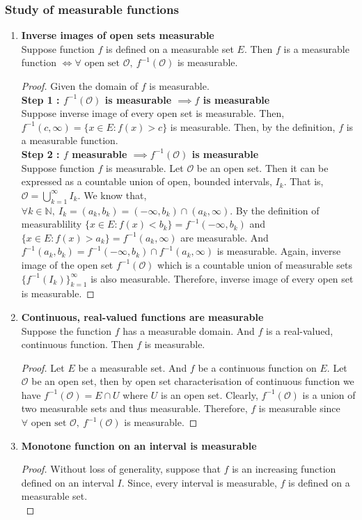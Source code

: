 \subsubsection{Study of measurable functions}
\begin{enumerate}
	\item \textbf{Inverse images of open sets measurable}\\
		Suppose function $f$ is defined on a measurable set $E$.
	Then $f$ is a measurable function $\iff \forall \text{ open set } \mathcal{O},\ f^{-1}(\mathcal{O})$ is measurable.
	\begin{proof}
	Given the domain of $f$ is measurable.\\
	\textbf{Step 1 : $f^{-1}(\mathcal{O})$ is measurable $\implies f$ is measurable}\\
	Suppose inverse image of every open set is measurable.
	Then, $f^{-1}(c,\infty) = \{ x \in E : f(x) > c \}$ is measurable.
	Then, by the definition, $f$ is a measurable function.\\

	\textbf{Step 2 : $f$ measurable $\implies f^{-1}(\mathcal{O})$ is measurable}\\
	Suppose function $f$ is measurable.
	Let $\mathcal{O}$ be an open set.
	Then it can be expressed as a countable union of open, bounded intervals, $I_k$.
	That is, $\displaystyle \mathcal{O} = \bigcup_{k=1}^\infty I_k$.
	We know that, $\forall k \in \mathbb{N},\ I_k = (a_k,b_k) = (-\infty,b_k) \cap (a_k,\infty)$.
	By the definition of measurablility $\{ x \in E : f(x) < b_k \} = f^{-1}(-\infty,b_k)$ and $\{ x\in E : f(x) > a_k \} = f^{-1}(a_k,\infty)$ are measurable.
	And $f^{-1}(a_k,b_k) = f^{-1}(-\infty,b_k) \cap f^{-1}(a_k,\infty)$  is measurable.
	Again, inverse image of the open set $f^{-1}(\mathcal{O})$ which is a countable union of measurable sets $\{f^{-1}(I_k)\}_{k=1}^\infty$ is also measurable.
	Therefore, inverse image of every open set is measurable.
	\end{proof}
\item \textbf{Continuous, real-valued functions are measurable}\\
	Suppose the function $f$ has a measurable domain. And $f$ is a real-valued, continuous function. Then $f$ is measurable.
	\begin{proof}
	Let $E$ be a measurable set.
	And $f$ be a continuous function on $E$.
	Let $\mathcal{O}$ be an open set, then by open set characterisation of continuous function we have $f^{-1}(\mathcal{O}) = E \cap U$ where $U$ is an open set.
	Clearly, $f^{-1}(\mathcal{O})$ is a union of two measurable sets and thus measurable.
	Therefore, $f$ is measurable since $\forall \text{ open set } \mathcal{O},\ f^{-1}(\mathcal{O})$ is measurable.
	\end{proof}
\item \textbf{Monotone function on an interval is measurable}
	\begin{proof}
		Without loss of generality, suppose that $f$ is an increasing function defined on an interval $I$.
		Since, every interval is measurable, $f$ is defined on a measurable set.\\


\end{proof}
\end{enumerate}

